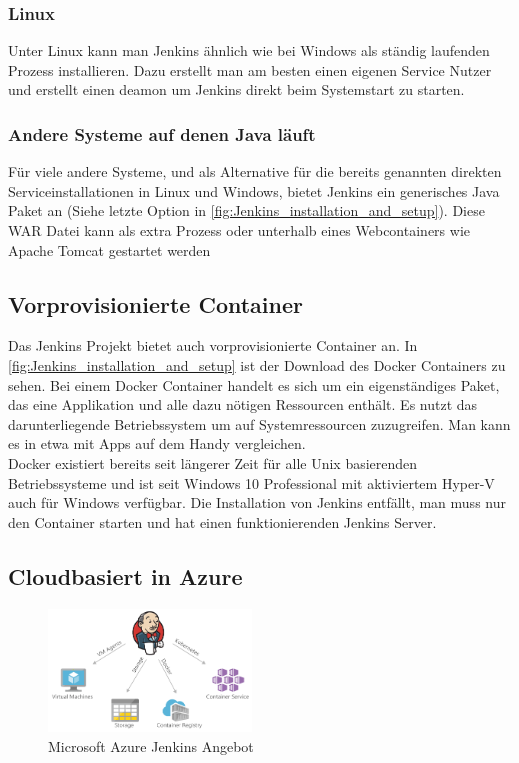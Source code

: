 \subsubsection*{Linux}
Unter Linux kann man Jenkins ähnlich wie bei Windows als ständig laufenden Prozess installieren. Dazu erstellt man am besten einen eigenen Service Nutzer  und erstellt einen deamon um Jenkins direkt beim Systemstart zu starten. \cite{jenkins-installing}
\subsubsection*{Andere Systeme auf denen Java läuft}
Für viele andere Systeme, und als Alternative für die bereits genannten direkten Serviceinstallationen in Linux und Windows, bietet Jenkins ein generisches Java Paket an (Siehe letzte Option in \autoref{fig:Jenkins_installation_and_setup}). Diese WAR Datei kann als extra Prozess oder unterhalb eines Webcontainers wie Apache Tomcat gestartet werden \cite{jenkins-installing}
\subsection{Vorprovisionierte Container}
Das Jenkins Projekt bietet auch vorprovisionierte Container an. In \autoref{fig:Jenkins_installation_and_setup} ist der Download des Docker Containers zu sehen. Bei einem Docker Container handelt es sich um ein eigenständiges Paket, das eine Applikation und alle dazu nötigen Ressourcen enthält. Es nutzt das darunterliegende Betriebssystem um auf Systemressourcen zuzugreifen. Man kann es in etwa mit Apps auf dem Handy vergleichen.\\
Docker existiert bereits seit längerer Zeit für alle Unix basierenden Betriebssysteme und ist seit Windows 10 Professional mit aktiviertem Hyper-V auch für Windows verfügbar. Die Installation von Jenkins entfällt, man muss nur den Container starten und hat einen funktionierenden Jenkins Server.
\subsection{Cloudbasiert in Azure}
\begin{figure}
  \begin{center}
    \includegraphics[width=0.48\textwidth]{./Images/Screenshot1.png}
  \end{center}
  \caption{Microsoft Azure Jenkins Angebot\cite{jenkins-azure}}\label{fig:Screenshot1}
\end{figure}

